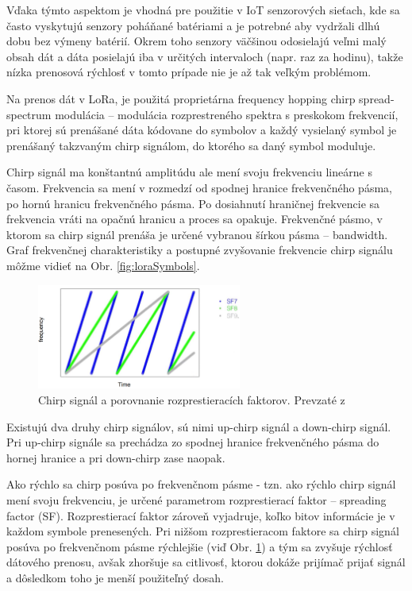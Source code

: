 \documentclass[slovak,master]{diploma}
\begin{document}
Vďaka týmto aspektom je vhodná pre použitie v IoT senzorových sieťach, kde sa často vyskytujú senzory poháňané batériami a je potrebné aby vydržali dlhú dobu 
bez výmeny batérií. Okrem toho senzory väčšinou odosielajú veľmi malý obsah dát a dáta posielajú iba v určitých intervaloch (napr. raz za hodinu), 
takže nízka prenosová rýchlosť v tomto prípade nie je až tak veľkým problémom.

Na prenos dát v LoRa, je použitá proprietárna frequency hopping chirp spread-spectrum modulácia -- modulácia rozprestreného spektra s preskokom frekvencií, pri ktorej sú prenášané dáta kódovane do symbolov 
a každý vysielaný symbol je prenášaný takzvaným chirp signálom, do ktorého sa daný symbol moduluje.

Chirp signál ma konštantnú amplitúdu ale mení svoju frekvenciu lineárne s časom. 
Frekvencia sa mení v rozmedzí od spodnej hranice frekvenčného pásma, po hornú hranicu frekvenčného pásma.
Po dosiahnutí hraničnej frekvencie sa frekvencia vráti na opačnú hranicu a proces sa opakuje.
Frekvenčné pásmo, v ktorom sa chirp signál prenáša je určené vybranou šírkou pásma -- bandwidth.
Graf frekvenčnej charakteristiky a postupné zvyšovanie frekvencie chirp signálu môžme vidieť na Obr. \ref{fig:loraSymbols}.
\begin{figure}
	\centering
	\includegraphics[width=0.6\textwidth]{Figures/spreading factors.png}
	\caption{Chirp signál a porovnanie rozprestieracích faktorov. Prevzaté z \cite{spreadfactorimage}}
	\label{fig:spreadingfactors}
\end{figure}

Existujú dva druhy chirp signálov, sú nimi up-chirp signál a down-chirp signál. Pri up-chirp signále sa prechádza zo spodnej hranice frekvenčného pásma do hornej hranice a pri 
down-chirp zase naopak.

\newpage
Ako rýchlo sa chirp posúva po frekvenčnom pásme - tzn. ako rýchlo chirp signál mení svoju frekvenciu, je určené parametrom rozprestierací faktor -- spreading factor (SF). 
Rozprestierací faktor zároveň vyjadruje, koľko bitov informácie je v každom symbole prenesených. Pri nižšom rozprestieracom faktore sa chirp signál posúva po 
frekvenčnom pásme rýchlejšie (viď Obr. \ref{fig:spreadingfactors}) a tým sa zvyšuje rýchlosť dátového prenosu, 
avšak zhoršuje sa citlivosť, ktorou dokáže prijímač prijať signál a dôsledkom toho je menší použiteľný dosah.
\end{document}
